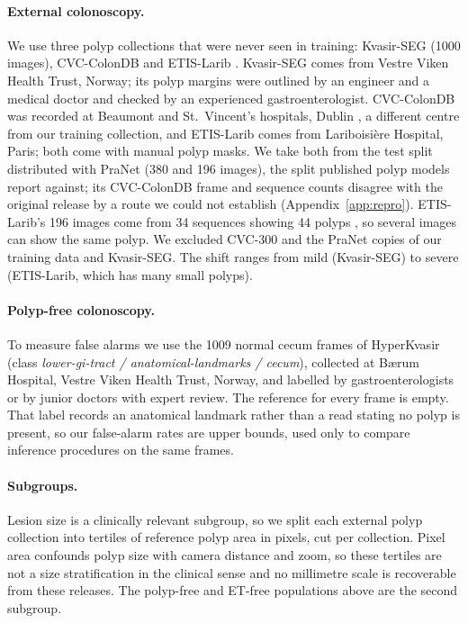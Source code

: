 \paragraph{External colonoscopy.} We use three polyp collections that were never seen in training: Kvasir-SEG \cite{jha2020kvasir} (1000 images), CVC-ColonDB \cite{bernal2012colondb} and ETIS-Larib \cite{silva2014etis}. Kvasir-SEG comes from Vestre Viken Health Trust, Norway; its polyp margins were outlined by an engineer and a medical doctor and checked by an experienced gastroenterologist. CVC-ColonDB \cite{bernal2012colondb} was recorded at Beaumont and St.\ Vincent's hospitals, Dublin \cite{tudela2024benchmark}, a different centre from our training collection, and ETIS-Larib comes from Lariboisi\`ere Hospital, Paris; both come with manual polyp masks. We take both from the test split distributed with PraNet \cite{fan2020pranet} (380 and 196 images), the split published polyp models report against; its CVC-ColonDB frame and sequence counts disagree with the original release by a route we could not establish (Appendix~\ref{app:repro}). ETIS-Larib's 196 images come from 34 sequences showing 44 polyps \cite{bernal2017challenge}, so several images can show the same polyp. We excluded CVC-300 and the PraNet copies of our training data and Kvasir-SEG. The shift ranges from mild (Kvasir-SEG) to severe (ETIS-Larib, which has many small polyps).

\paragraph{Polyp-free colonoscopy.} To measure false alarms we use the 1009 normal cecum frames of HyperKvasir \cite{borgli2020hyperkvasir} (class \emph{lower-gi-tract / anatomical-landmarks / cecum}), collected at B\ae{}rum Hospital, Vestre Viken Health Trust, Norway, and labelled by gastroenterologists or by junior doctors with expert review. The reference for every frame is empty. That label records an anatomical landmark rather than a read stating no polyp is present, so our false-alarm rates are upper bounds, used only to compare inference procedures on the same frames.

\paragraph{Subgroups.} Lesion size is a clinically relevant subgroup, so we split each external polyp collection into tertiles of reference polyp area in pixels, cut per collection. Pixel area confounds polyp size with camera distance and zoom, so these tertiles are not a size stratification in the clinical sense and no millimetre scale is recoverable from these releases. The polyp-free and ET-free populations above are the second subgroup.

